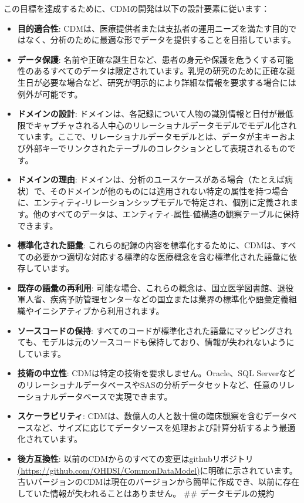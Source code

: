 \documentclass[
  11pt]{book}
\providecommand{\tightlist}{%
  \setlength{\itemsep}{0pt}\setlength{\parskip}{0pt}}
\theoremstyle{definition}
\theoremstyle{definition}
\theoremstyle{definition}
\theoremstyle{definition}
\theoremstyle{remark}
\begin{document}
この目標を達成するために、CDMの開発は以下の設計要素に従います：

\begin{itemize}
\tightlist
\item
  \textbf{目的適合性}: CDMは、医療提供者または支払者の運用ニーズを満たす目的ではなく、分析のために最適な形でデータを提供することを目指しています。 
\item
  \textbf{データ保護}: 名前や正確な誕生日など、患者の身元や保護を危うくする可能性のあるすべてのデータは限定されています。乳児の研究のために正確な誕生日が必要な場合など、研究が明示的により詳細な情報を要求する場合には例外が可能です。 
\item
  \textbf{ドメインの設計}: ドメインは、各記録について人物の識別情報と日付が最低限でキャプチャされる人中心のリレーショナルデータモデルでモデル化されています。ここで、リレーショナルデータモデルとは、データが主キーおよび外部キーでリンクされたテーブルのコレクションとして表現されるものです。
\item
  \textbf{ドメインの理由}: ドメインは、分析のユースケースがある場合（たとえば病状）で、そのドメインが他のものには適用されない特定の属性を持つ場合に、エンティティ-リレーションシップモデルで特定され、個別に定義されます。他のすべてのデータは、エンティティ-属性-値構造の観察テーブルに保持できます。 
\item
  \textbf{標準化された語彙}: これらの記録の内容を標準化するために、CDMは、すべての必要かつ適切な対応する標準的な医療概念を含む標準化された語彙に依存しています。
\item
  \textbf{既存の語彙の再利用}: 可能な場合、これらの概念は、国立医学図書館、退役軍人省、疾病予防管理センターなどの国立または業界の標準化や語彙定義組織やイニシアティブから利用されます。
\item
  \textbf{ソースコードの保持}: すべてのコードが標準化された語彙にマッピングされても、モデルは元のソースコードも保持しており、情報が失われないようにしています。  
\item
  \textbf{技術の中立性}: CDMは特定の技術を要求しません。Oracle、SQL ServerなどのリレーショナルデータベースやSASの分析データセットなど、任意のリレーショナルデータベースで実現できます。 
\item
  \textbf{スケーラビリティ}: CDMは、数億人の人と数十億の臨床観察を含むデータベースなど、サイズに応じてデータソースを処理および計算分析するよう最適化されています。 
\item
  \textbf{後方互換性}: 以前のCDMからのすべての変更はgithubリポジトリ\href{https://github.com/OHDSI/CommonDataModel}{(https://github.com/OHDSI/CommonDataModel)}に明確に示されています。古いバージョンのCDMは現在のバージョンから簡単に作成でき、以前に存在していた情報が失われることはありません。 
  \#\# データモデルの規約
\end{itemize}
\end{document}
